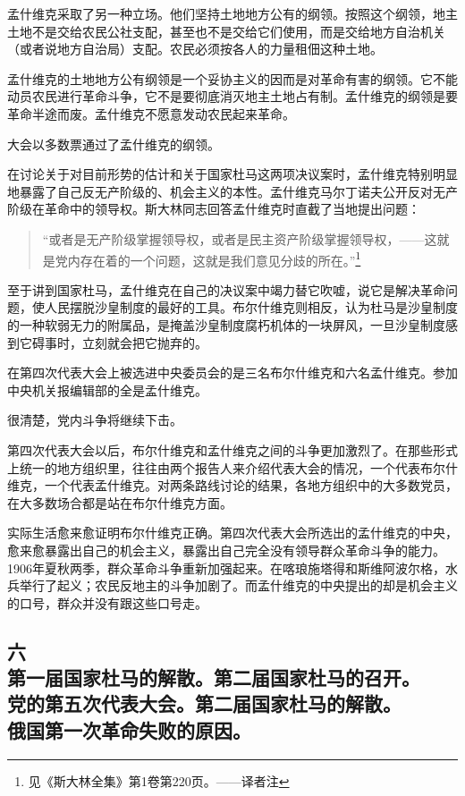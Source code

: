 孟什维克采取了另一种立场。他们坚持土地地方公有的纲领。按照这个纲领，地主土地不是交给农民公社支配，甚至也不是交给它们使用，而是交给地方自治机关（或者说地方自治局）支配。农民必须按各人的力量租佃这种土地。

孟什维克的土地地方公有纲领是一个妥协主义的因而是对革命有害的纲领。它不能动员农民进行革命斗争，它不是要彻底消灭地主土地占有制。孟什维克的纲领是要革命半途而废。孟什维克不愿意发动农民起来革命。

大会以多数票通过了孟什维克的纲领。

在讨论关于对目前形势的估计和关于国家杜马这两项决议案时，孟什维克特别明显地暴露了自己反无产阶级的、机会主义的本性。孟什维克马尔丁诺夫公开反对无产阶级在革命中的领导权。斯大林同志回答孟什维克时直截了当地提出问题：

\begin{quotation}
“或者是无产阶级掌握领导权，或者是民主资产阶级掌握领导权，——这就是党内存在着的一个问题，这就是我们意见分歧的所在。”\footnote{见《斯大林全集》第1卷第220页。——译者注}
\end{quotation}

至于讲到国家杜马，孟什维克在自己的决议案中竭力替它吹嘘，说它是解决革命问题，使人民摆脱沙皇制度的最好的工具。布尔什维克则相反，认为杜马是沙皇制度的一种软弱无力的附属品，是掩盖沙皇制度腐朽机体的一块屏风，一旦沙皇制度感到它碍事时，立刻就会把它抛弃的。

在第四次代表大会上被选进中央委员会的是三名布尔什维克和六名孟什维克。参加中央机关报编辑部的全是孟什维克。

很清楚，党内斗争将继续下击。

第四次代表大会以后，布尔什维克和孟什维克之间的斗争更加激烈了。在那些形式上统一的地方组织里，往往由两个报告人来介绍代表大会的情况，一个代表布尔什维克，一个代表孟什维克。对两条路线讨论的结果，各地方组织中的大多数党员，在大多数场合都是站在布尔什维克方面。

实际生活愈来愈证明布尔什维克正确。第四次代表大会所选出的孟什维克的中央，愈来愈暴露出自己的机会主义，暴露出自己完全没有领导群众革命斗争的能力。1906年夏秋两季，群众革命斗争重新加强起来。在喀琅施塔得和斯维阿波尔格，水兵举行了起义；农民反地主的斗争加剧了。而孟什维克的中央提出的却是机会主义的口号，群众并没有跟这些口号走。


\subsection[六\q 第一届国家杜马的解散。第二届国家杜马的召开。党的第五次代表大会。第二届国家杜马的解散。俄国第一次革命失败的原因。]{六\\第一届国家杜马的解散。第二届国家杜马的召开。\\党的第五次代表大会。第二届国家杜马的解散。\\俄国第一次革命失败的原因。}

